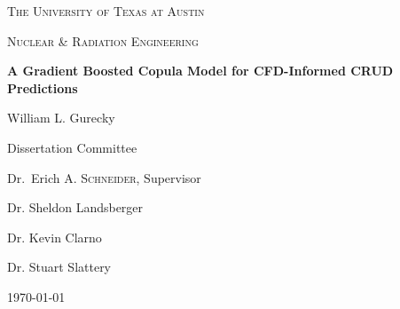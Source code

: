 
\begin{titlepage}
	\centering
	{\scshape\LARGE The University of Texas at Austin \par}
	\vspace{1cm}
	{\scshape\Large Nuclear \& Radiation Engineering \par}
	\vspace{1.5cm}
	{\huge\bfseries A Gradient Boosted Copula Model for CFD-Informed CRUD Predictions \par}
	\vspace{2cm}
	{\Large William L. Gurecky \par}
	\vfill

	\begin{flushright}
	Dissertation Committee \par
	\bigskip
	Dr.~Erich A. \textsc{Schneider}, Supervisor \par
	Dr. Sheldon Landsberger \par
	Dr. Kevin Clarno \par
	Dr. Stuart Slattery \par
	\end{flushright}
	\vfill
	{\large \today\par}
\end{titlepage}
\pagebreak
\tableofcontents
\pagebreak

